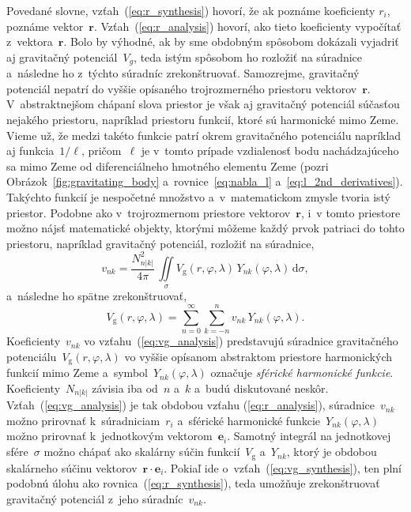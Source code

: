 \documentclass[a4paper, 12pt]{book}
\newcommand{\diff}{\mathrm d}
\newcommand{\gidx}{\mathrm g}
\let\vec\mathbf
\begin{document}
Povedané slovne, vzťah~(\ref{eq:r_synthesis}) hovorí, že ak poznáme koeficienty 
$r_i$, poznáme vektor~$\vec r$.  Vzťah~(\ref{eq:r_analysis}) hovorí, ako tieto 
koeficienty vypočítať z~vektora~$\vec r$.  Bolo by výhodné, ak by sme obdobným 
spôsobom dokázali vyjadriť aj gravitačný potenciál~$V_g$, teda istým spôsobom 
ho rozložiť na súradnice a~následne ho z~týchto súradníc zrekonštruovať.  
Samozrejme, gravitačný potenciál nepatrí do vyššie opísaného trojrozmerného 
priestoru vektorov~$\vec r$.  V~abstraktnejšom chápaní slova priestor je však 
aj gravitačný potenciál súčasťou nejakého priestoru, napríklad priestoru 
funkcií, ktoré sú harmonické mimo Zeme.  Vieme už, že medzi takéto funkcie 
patrí okrem gravitačného potenciálu napríklad aj funkcia~$1 \slash \ell$, 
pričom~$\ell$ je v~tomto prípade vzdialenosť bodu nachádzajúceho sa mimo Zeme 
od diferenciálneho hmotného elementu Zeme (pozri 
Obrázok~\ref{fig:gravitating_body} a~rovnice~\ref{eq:nabla_l} 
a~\ref{eq:l_2nd_derivatives}).  Takýchto funkcií je nespočetné množstvo 
a~v~matematickom zmysle tvoria istý priestor.  Podobne ako v~trojrozmernom 
priestore vektorov~$\vec r$, i~v tomto priestore možno nájsť matematické 
objekty, ktorými môžeme každý prvok patriaci do tohto priestoru, napríklad 
gravitačný potenciál, rozložiť na súradnice,
%
\begin{equation}
\label{eq:vg_analysis}
v_{nk} = \frac{N^2_{n|k|}}{4\pi} \, \iint\limits_{\sigma} V_\gidx(r, \varphi, 
\lambda) \, Y_{nk}(\varphi, \lambda) \, \diff \sigma{,}
\end{equation}
%
a~následne ho spätne zrekonštruovať,
%
\begin{equation}
\label{eq:vg_synthesis}
V_\gidx(r, \varphi, \lambda) = \sum_{n = 0}^{\infty} \sum_{k = -n}^{n} v_{nk}
\, Y_{nk}(\varphi, \lambda){.}
\end{equation}
%
Koeficienty~$v_{nk}$ vo vzťahu~(\ref{eq:vg_analysis}) predstavujú súradnice
gravitačného potenciálu~$V_\gidx(r, \varphi, \lambda)$ vo vyššie opísanom
abstraktom priestore harmonických funkcií mimo Zeme a~symbol~$Y_{nk}(\varphi, 
\lambda)$
označuje \emph{sférické harmonické funkcie}.  Koeficienty~$N_{n|k|}$ závisia
iba od~$n$ a~$k$ a~budú diskutované neskôr.  Vzťah~(\ref{eq:vg_analysis}) je
tak obdobou vzťahu (\ref{eq:r_analysis}), súradnice~$v_{nk}$ možno prirovnať
k~súradniciam~$r_i$ a~sférické harmonické funkcie~$Y_{nk}(\varphi, \lambda)$
možno prirovnať k~jednotkovým vektorom~$\vec e_i$.  Samotný integrál na
jednotkovej sfére~$\sigma$ možno chápať ako skalárny súčin funkcií~$V_\gidx$
a~$Y_{nk}$, ktorý je obdobou skalárneho súčinu vektorov~$\vec r \cdot \vec
e_i$.  Pokiaľ ide o~vzťah~(\ref{eq:vg_synthesis}), ten plní podobnú úlohu ako
rovnica~(\ref{eq:r_synthesis}), teda umožňuje zrekonštruovať gravitačný
potenciál z~jeho súradníc~$v_{nk}$.
\end{document}
